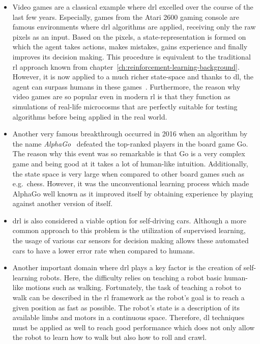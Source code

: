 \documentclass[draft,final]{vutinfth} %
\begin{document}
    \begin{itemize}
        \item Video games are a classical example where \gls{drl} excelled over the course of the last few years.
        Especially, games from the Atari 2600 gaming console are famous environments where \gls{drl} algorithms are applied, receiving only the raw pixels as an input.
        Based on the pixels, a state-representation is formed on which the agent takes actions, makes mistakes, gains experience and finally improves its decision making.
        This procedure is equivalent to the traditional \gls{rl} approach known from chapter~\ref{ch:reinforcement-learning-background}.
        However, it is now applied to a much richer state-space and thanks to \gls{dl}, the agent can surpass humans in these games~\citep{mnih_playing_2013,schulman_trust_2015}.
        Furthermore, the reason why video games are so popular even in modern \gls{rl} is that they function as simulations of real-life microcosms that are perfectly suitable for testing algorithms before being applied in the real world.

        \item   Another very famous breakthrough occurred in 2016 when an algorithm by the name \textit{AlphaGo}~\citep{silver_mastering_2017} defeated the top-ranked players in the board game Go.
        The reason why this event was so remarkable is that Go is a very complex game and being good at it takes a lot of human-like intuition.
        Additionally, the state space is very large when compared to other board games such as e.g.\ chess.
        However, it was the unconventional learning process which made AlphaGo well known as it improved itself by obtaining experience by playing against another version of itself.

        \item   \gls{drl} is also considered a viable option for self-driving cars.
        Although a more common approach to this problem is the utilization of supervised learning, the usage of various car sensors for decision making allows these automated cars to have a lower error rate when compared to humans.
        \item   Another important domain where \gls{drl} plays a key factor is the creation of self-learning robots.
        Here, the difficulty relies on teaching a robot basic human-like motions such as walking.
        Fortunately, the task of teaching a robot to walk can be described in the \gls{rl} framework as the robot's goal is to reach a given position as fast as possible.
        The robot's state is a description of its available limbs and motors in a continuous space.
        Therefore, \gls{dl} techniques must be applied as well to reach good performance which does not only allow the robot to learn how to walk but also how to roll and crawl.
    \end{itemize}
\end{document}

